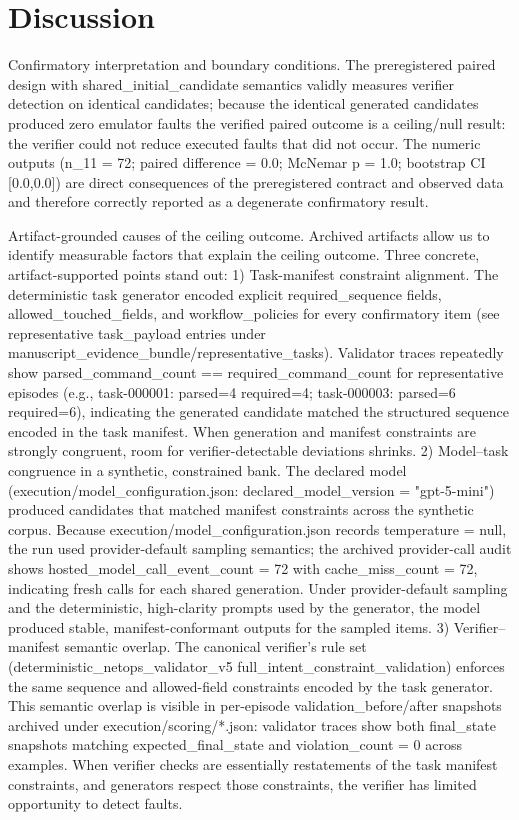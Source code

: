 \documentclass[conference]{IEEEtran}
\begin{document}
\section{Discussion}
Confirmatory interpretation and boundary conditions. The preregistered paired design with shared\_initial\_candidate semantics validly measures verifier detection on identical candidates; because the identical generated candidates produced zero emulator faults the verified paired outcome is a ceiling/null result: the verifier could not reduce executed faults that did not occur. The numeric outputs (n\_11 = 72; paired difference = 0.0; McNemar p = 1.0; bootstrap CI [0.0,0.0]) are direct consequences of the preregistered contract and observed data and therefore correctly reported as a degenerate confirmatory result.

Artifact-grounded causes of the ceiling outcome. Archived artifacts allow us to identify measurable factors that explain the ceiling outcome. Three concrete, artifact-supported points stand out:
1) Task-manifest constraint alignment. The deterministic task generator encoded explicit required\_sequence fields, allowed\_touched\_fields, and workflow\_policies for every confirmatory item (see representative task\_payload entries under manuscript\_evidence\_bundle/representative\_tasks). Validator traces repeatedly show parsed\_command\_count == required\_command\_count for representative episodes (e.g., task-000001: parsed=4 required=4; task-000003: parsed=6 required=6), indicating the generated candidate matched the structured sequence encoded in the task manifest. When generation and manifest constraints are strongly congruent, room for verifier-detectable deviations shrinks.
2) Model--task congruence in a synthetic, constrained bank. The declared model (execution/model\_configuration.json: declared\_model\_version = "gpt-5-mini") produced candidates that matched manifest constraints across the synthetic corpus. Because execution/model\_configuration.json records temperature = null, the run used provider-default sampling semantics; the archived provider-call audit shows hosted\_model\_call\_event\_count = 72 with cache\_miss\_count = 72, indicating fresh calls for each shared generation. Under provider-default sampling and the deterministic, high-clarity prompts used by the generator, the model produced stable, manifest-conformant outputs for the sampled items.
3) Verifier--manifest semantic overlap. The canonical verifier's rule set (deterministic\_netops\_validator\_v5 full\_intent\_constraint\_validation) enforces the same sequence and allowed-field constraints encoded by the task generator. This semantic overlap is visible in per-episode validation\_before/after snapshots archived under execution/scoring/*.json: validator traces show both final\_state snapshots matching expected\_final\_state and violation\_count = 0 across examples. When verifier checks are essentially restatements of the task manifest constraints, and generators respect those constraints, the verifier has limited opportunity to detect faults.
\end{document}
